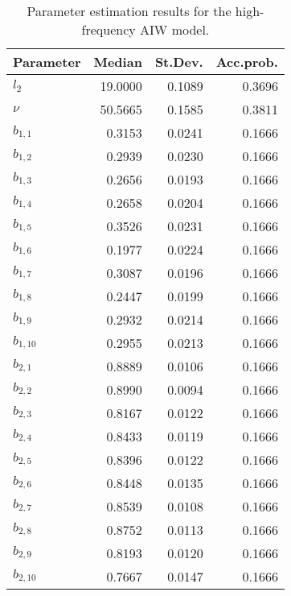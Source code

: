 \begin{table}[ht]
\centering
\caption{Parameter estimation results for the high-frequency AIW model.} 
\label{table:all_pars_hf}
\begingroup\footnotesize
\begin{tabular}{lrrr}
  \hline
Parameter & Median & St.Dev. & Acc.prob. \\ 
  \hline
$l_2$ & 19.0000 & 0.1089 & 0.3696 \\ 
  $\nu$ & 50.5665 & 0.1585 & 0.3811 \\ 
  $b_{1,1}$ & 0.3153 & 0.0241 & 0.1666 \\ 
  $b_{1,2}$ & 0.2939 & 0.0230 & 0.1666 \\ 
  $b_{1,3}$ & 0.2656 & 0.0193 & 0.1666 \\ 
  $b_{1,4}$ & 0.2658 & 0.0204 & 0.1666 \\ 
  $b_{1,5}$ & 0.3526 & 0.0231 & 0.1666 \\ 
  $b_{1,6}$ & 0.1977 & 0.0224 & 0.1666 \\ 
  $b_{1,7}$ & 0.3087 & 0.0196 & 0.1666 \\ 
  $b_{1,8}$ & 0.2447 & 0.0199 & 0.1666 \\ 
  $b_{1,9}$ & 0.2932 & 0.0214 & 0.1666 \\ 
  $b_{1,10}$ & 0.2955 & 0.0213 & 0.1666 \\ 
  $b_{2,1}$ & 0.8889 & 0.0106 & 0.1666 \\ 
  $b_{2,2}$ & 0.8990 & 0.0094 & 0.1666 \\ 
  $b_{2,3}$ & 0.8167 & 0.0122 & 0.1666 \\ 
  $b_{2,4}$ & 0.8433 & 0.0119 & 0.1666 \\ 
  $b_{2,5}$ & 0.8396 & 0.0122 & 0.1666 \\ 
  $b_{2,6}$ & 0.8448 & 0.0135 & 0.1666 \\ 
  $b_{2,7}$ & 0.8539 & 0.0108 & 0.1666 \\ 
  $b_{2,8}$ & 0.8752 & 0.0113 & 0.1666 \\ 
  $b_{2,9}$ & 0.8193 & 0.0120 & 0.1666 \\ 
  $b_{2,10}$ & 0.7667 & 0.0147 & 0.1666 \\ 
   \hline
\end{tabular}
\endgroup
\end{table}
